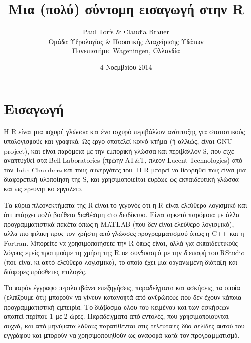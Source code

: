 \documentclass[a4paper,10pt,twocolumn]{article}
\title{\vspace{-13mm} \textbf{Μια (πολύ) σύντομη εισαγωγή στην R}}
\author{Paul Torfs \& Claudia Brauer\\
\small{Ομάδα Υδρολογίας \& Ποσοτικής Διαχείρισης Υδάτων}\\
\small{Πανεπιστήμιο Wageningen, Ολλανδία}}
\date{\small{4 Νοεμβρίου 2014}}
\begin{document}
\maketitle


\section{Εισαγωγή}

Η R είναι μια ισχυρή γλώσσα και ένα ισχυρό περιβάλλον ανάπτυξης για στατιστικούς
υπολογισμούς και γραφικά. Ως έργο αποτελεί κοινό κτήμα (ή αλλιώς, είναι GNU project),
και είναι παρόμοια με την εμπορική γλώσσα και περιβάλλον S, που είχε αναπτυχθεί στα Bell 
Laboratories (πρώην AT\&T, πλέον Lucent Technologies) από τον John Chambers και τους συνεργάτες
του. Η R μπορεί να θεωρηθεί πως είναι μια διαφορετική υλοποίηση της S, και χρησιμοποιείται ευρέως
ως εκπαιδευτική γλώσσα και ως ερευνητικό εργαλείο.

Τα κύρια πλεονεκτήματα της R είναι το γεγονός ότι η R είναι ελεύθερο λογισμικό και ότι υπάρχει
πολύ βοήθεια διαθέσιμη στο διαδίκτυο. Είναι αρκετά παρόμοια με άλλα προγραμματιστικά πακέτα όπως 
η MATLAB (που δεν είναι ελεύθερο λογισμικό), αλλά πιο φιλική προς τον χρήστη από γλώσσες
προγραμματισμού όπως η C++ και η Fortran. Μπορείτε να χρησιμοποιήσετε την R όπως είναι, αλλά για
εκπαιδευτικούς λόγους εμείς προτιμούμε τη χρήση της R σε συνδυασμό με την διεπαφή του RStudio
(που είναι κι αυτό ελεύθερο λογισμικό), το οποίο έχει μια οργανωμένη διάταξη και διάφορες πρόσθετες
επιλογές.

Το παρόν έγγραφο περιλαμβάνει επεξηγήσεις, παραδείγματα και ασκήσεις, τα οποία (ελπίζουμε ότι)
μπορούν να γίνουν κατανοητά από ανθρώπους που δεν έχουν κάποια προγραμματιστική εμπειρία. Το διάβασμα
όλου του κειμένου και των ασκήσεων απαιτεί περίπου 1 με 2 ώρες. Παραδείγματα από εντολές, που 
χρησιμοποιούνται συχνά, και από μηνύματα λάθους παρατίθενται στις τελευταίες δύο σελίδες αυτού
του εγγράφου και μπορούν να χρησιμοποιηθούν ως αναφορά κατά τον προγραμματισμό.


\end{document}
